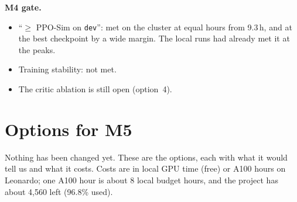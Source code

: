 \documentclass[10pt]{article}
\begin{document}
\textbf{M4 gate.}
\begin{itemize}
  \item ``$\geq$ PPO-Sim on \texttt{dev}'': met on the cluster at equal hours from 9.3\,h, and at the
  best checkpoint by a wide margin. The local runs had already met it at the peaks.
  \item Training stability: not met.
  \item The critic ablation is still open (option~4).
\end{itemize}

\section{Options for M5}
\label{sec:options}

Nothing has been changed yet. These are the options, each with what it would tell us and what it costs.
Costs are in local GPU time (free) or A100 hours on Leonardo; one A100 hour is about 8 local budget
hours, and the project has about 4,560 left (96.8\% used).
\end{document}
